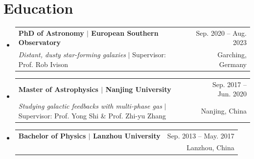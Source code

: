 \documentclass[A4,11pt]{article}
\makeatletter
\newcommand{\CVSubheading}[4]{
  \vspace{-2pt}\item
    \begin{tabular*}{0.97\textwidth}[t]{l@{\extracolsep{\fill}}r}
      \textbf{#1} & #2 \\
      \small#3 & \small #4 \\
    \end{tabular*}\vspace{-7pt}
}
\newcommand{\CVSubHeadingListStart}{\begin{itemize}[leftmargin=0.5cm, label={}]}
\newcommand{\CVSubHeadingListEnd}{\end{itemize}}
\makeatother
\begin{document}

\section{Education}
  \CVSubHeadingListStart
    \CVSubheading
    {{PhD of Astronomy $|$ {\small{European Southern Observatory}}}}{Sep. 2020 -- Aug. 2023}
     {\emph{Distant, dusty star-forming galaxies} $|$ Supervisor: Prof. Rob Ivison}{Garching, Germany}
    \CVSubheading
      {{Master of Astrophysics $|$ {\small{Nanjing University}}}}{Sep. 2017 -- Jun. 2020}
      {\emph{Studying galactic feedbacks with multi-phase gas} $|$ Supervisor: Prof. Yong Shi \& Prof. Zhi-yu Zhang}{Nanjing, China}
    \CVSubheading
      {{Bachelor of Physics $|$ {\small{Lanzhou University}}}}{Sep. 2013 -- May. 2017}
      {\emph{}}{Lanzhou, China}
  \CVSubHeadingListEnd
\end{document}
